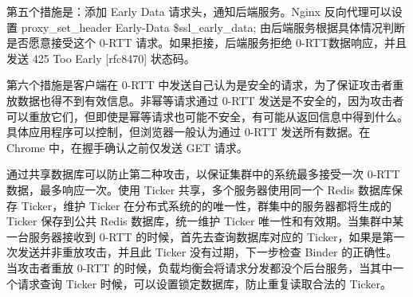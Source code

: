 第五个措施是：添加 Early Data 请求头，通知后端服务。Nginx 反向代理可以设置 proxy\_set\_header Early-Data \$ssl\_early\_data; 由后端服务根据具体情况判断是否愿意接受这个 0-RTT 请求。如果拒接，后端服务拒绝 0-RTT数据响应，并且发送 425 Too Early [rfc8470] 状态码。

第六个措施是客户端在 0-RTT 中发送自己认为是安全的请求，为了保证攻击者重放数据也得不到有效信息。非幂等请求通过 0-RTT 发送是不安全的，因为攻击者可以重放它们，但即使是幂等请求也可能不安全，有可能从返回信息中得到什么。具体应用程序可以控制，但浏览器一般认为通过 0-RTT 发送所有数据。在 Chrome 中，在握手确认之前仅发送 GET 请求。

通过共享数据库可以防止第二种攻击，以保证集群中的系统最多接受一次 0-RTT 数据，最多响应一次。使用 Ticker 共享，多个服务器使用同一个 Redis 数据库保存 Ticker，维护 Ticker 在分布式系统的的唯一性，群集中的服务器都将生成的 Ticker 保存到公共 Redis 数据库，统一维护 Ticker 唯一性和有效期。当集群中某一台服务器接收到 0-RTT 的时候，首先去查询数据库对应的 Ticker，如果是第一次发送并非重放攻击，并且此 Ticker 没有过期，下一步检查 Binder 的正确性。当攻击者重放 0-RTT 的时候，负载均衡会将请求分发都没个后台服务，当其中一个请求查询 Ticker 时候，可以设置锁定数据库，防止重复读取合法的 Ticker。

\afterpage{\null\newpage}

